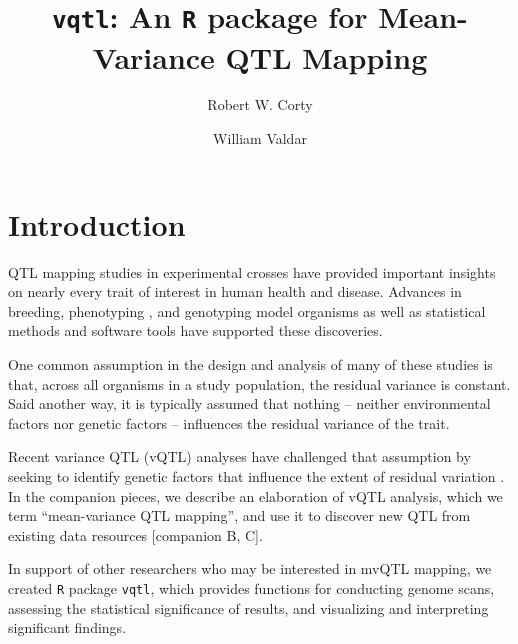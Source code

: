 \documentclass[9pt,twocolumn,twoside]{gsag3jnl}
\title{\texttt{vqtl}: An \texttt{R} package for Mean-Variance QTL Mapping}
\author[$\ast$,1]{Robert W. Corty}
\author[$\ast, 1$]{William Valdar}
\affil[$\ast$]{University of North Carolina at Chapel Hill, Department of Genetics}
\begin{document}
\maketitle
\thispagestyle{firststyle}
\logomark
\articletypemark
\marginmark
\firstpagefootnote
{}
\vspace{-24pt}%




\section*{Introduction}

QTL mapping studies in experimental crosses have provided important insights on nearly every trait of interest in human health and disease.
Advances in breeding, phenotyping \citep{Yang2014a}, and genotyping \citep{Williams1990} model organisms as well as statistical methods \citep{Lander1989a} and software tools \citep{Broman2003} have supported these discoveries.

One common assumption in the design and analysis of many of these studies is that, across all organisms in a study population, the residual variance is constant.
Said another way, it is typically assumed that nothing -- neither environmental factors nor genetic factors -- influences the residual variance of the trait.


Recent variance QTL (vQTL) analyses have challenged that assumption by seeking to identify genetic factors that influence the extent of residual variation \citep{Pare2010,Ronnegard2011a,Ronnegard2012,Cao2014}.
In the companion pieces, we describe an elaboration of vQTL analysis, which we term ``mean-variance QTL mapping'', and use it to discover new QTL from existing data resources [companion B, C].

In support of other researchers who may be interested in mvQTL mapping, we created \texttt{R} package \texttt{vqtl}, which provides functions for conducting genome scans, assessing the statistical significance of results, and visualizing and interpreting significant findings.
\end{document}
